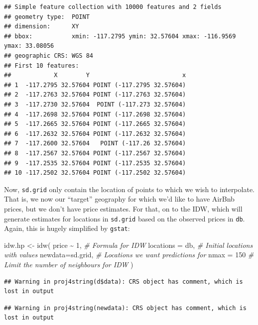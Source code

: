 \documentclass[
]{book}
\newenvironment{Shaded}{\begin{snugshade}}{\end{snugshade}}
\newcommand{\AttributeTok}[1]{\textcolor[rgb]{0.77,0.63,0.00}{#1}}
\newcommand{\CommentTok}[1]{\textcolor[rgb]{0.56,0.35,0.01}{\textit{#1}}}
\newcommand{\DecValTok}[1]{\textcolor[rgb]{0.00,0.00,0.81}{#1}}
\newcommand{\FunctionTok}[1]{\textcolor[rgb]{0.00,0.00,0.00}{#1}}
\newcommand{\NormalTok}[1]{#1}
\newcommand{\OtherTok}[1]{\textcolor[rgb]{0.56,0.35,0.01}{#1}}
\newcommand{\SpecialCharTok}[1]{\textcolor[rgb]{0.00,0.00,0.00}{#1}}
\begin{document}
\begin{verbatim}
## Simple feature collection with 10000 features and 2 fields
## geometry type:  POINT
## dimension:      XY
## bbox:           xmin: -117.2795 ymin: 32.57604 xmax: -116.9569 ymax: 33.08056
## geographic CRS: WGS 84
## First 10 features:
##            X        Y                          x
## 1  -117.2795 32.57604 POINT (-117.2795 32.57604)
## 2  -117.2763 32.57604 POINT (-117.2763 32.57604)
## 3  -117.2730 32.57604  POINT (-117.273 32.57604)
## 4  -117.2698 32.57604 POINT (-117.2698 32.57604)
## 5  -117.2665 32.57604 POINT (-117.2665 32.57604)
## 6  -117.2632 32.57604 POINT (-117.2632 32.57604)
## 7  -117.2600 32.57604   POINT (-117.26 32.57604)
## 8  -117.2567 32.57604 POINT (-117.2567 32.57604)
## 9  -117.2535 32.57604 POINT (-117.2535 32.57604)
## 10 -117.2502 32.57604 POINT (-117.2502 32.57604)
\end{verbatim}

Now, \texttt{sd.grid} only contain the location of points to which we wish to interpolate. That is, we now our ``target'' geography for which we'd like to have AirBnb prices, but we don't have price estimates. For that, on to the IDW, which will generate estimates for locations in \texttt{sd.grid} based on the observed prices in \texttt{db}. Again, this is hugely simplified by \texttt{gstat}:

\begin{Shaded}
\begin{Highlighting}[]
\NormalTok{idw.hp }\OtherTok{\textless{}{-}} \FunctionTok{idw}\NormalTok{(}
\NormalTok{  price }\SpecialCharTok{\textasciitilde{}} \DecValTok{1}\NormalTok{,         }\CommentTok{\# Formula for IDW}
  \AttributeTok{locations =}\NormalTok{ db,    }\CommentTok{\# Initial locations with values}
  \AttributeTok{newdata=}\NormalTok{sd.grid,   }\CommentTok{\# Locations we want predictions for}
  \AttributeTok{nmax =} \DecValTok{150}         \CommentTok{\# Limit the number of neighbours for IDW}
\NormalTok{)}
\end{Highlighting}
\end{Shaded}

\begin{verbatim}
## Warning in proj4string(d$data): CRS object has comment, which is lost in output
\end{verbatim}

\begin{verbatim}
## Warning in proj4string(newdata): CRS object has comment, which is lost in output
\end{verbatim}
\end{document}
